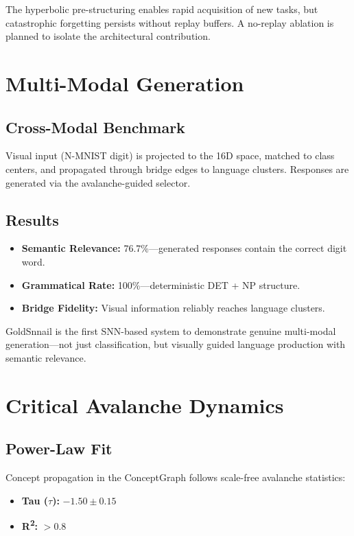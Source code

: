 \documentclass[conference]{IEEEtran}
\begin{document}
The hyperbolic pre-structuring enables rapid acquisition of new tasks, but catastrophic forgetting persists without replay buffers. A no-replay ablation is planned to isolate the architectural contribution.

\section{Multi-Modal Generation}

\subsection{Cross-Modal Benchmark}
Visual input (N-MNIST digit) is projected to the 16D space, matched to class centers, and propagated through bridge edges to language clusters. Responses are generated via the avalanche-guided selector.

\subsection{Results}
\begin{itemize}
    \item \textbf{Semantic Relevance:} 76.7\%---generated responses contain the correct digit word.
    \item \textbf{Grammatical Rate:} 100\%---deterministic DET + NP structure.
    \item \textbf{Bridge Fidelity:} Visual information reliably reaches language clusters.
\end{itemize}

GoldSnnail is the first SNN-based system to demonstrate genuine multi-modal generation---not just classification, but visually guided language production with semantic relevance.

\section{Critical Avalanche Dynamics}

\subsection{Power-Law Fit}
Concept propagation in the ConceptGraph follows scale-free avalanche statistics:
\begin{itemize}
    \item \textbf{Tau ($\tau$):} $-1.50 \pm 0.15$
    \item \textbf{R\textsuperscript{2}:} $> 0.8$
\end{itemize}
\end{document}
